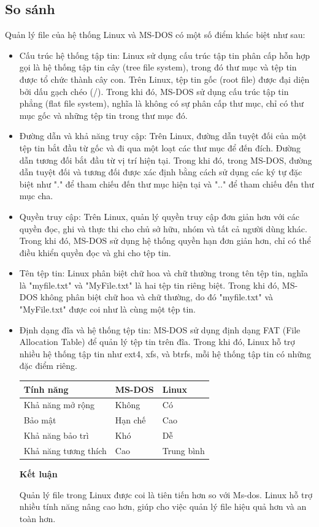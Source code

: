 \documentclass[12pt,a4paper]{article}
\begin{document}
\subsection{So sánh}
Quản lý file của hệ thống Linux và MS-DOS có một số điểm khác biệt như sau:
\begin{itemize}
	\item Cấu trúc hệ thống tập tin: Linux sử dụng cấu trúc tập tin phân cấp hỗn hợp gọi là hệ thống tập tin cây (tree file system), trong đó thư mục và tệp tin được tổ chức thành cây con. Trên Linux, tệp tin gốc (root file) được đại diện bởi dấu gạch chéo (/). Trong khi đó, MS-DOS sử dụng cấu trúc tập tin phẳng (flat file system), nghĩa là không có sự phân cấp thư mục, chỉ có thư mục gốc và những tệp tin trong thư mục đó.
	\item Đường dẫn và khả năng truy cập: Trên Linux, đường dẫn tuyệt đối của một tệp tin bắt đầu từ gốc và đi qua một loạt các thư mục để đến đích. Đường dẫn tương đối bắt đầu từ vị trí hiện tại. Trong khi đó, trong MS-DOS, đường dẫn tuyệt đối và tương đối được xác định bằng cách sử dụng các ký tự đặc biệt như "." để tham chiếu đến thư mục hiện tại và ".." để tham chiếu đến thư mục cha.
	\item Quyền truy cập: Trên Linux, quản lý quyền truy cập đơn giản hơn với các quyền đọc, ghi và thực thi cho chủ sở hữu, nhóm và tất cả người dùng khác. Trong khi đó, MS-DOS sử dụng hệ thống quyền hạn đơn giản hơn, chỉ có thể điều khiển quyền đọc và ghi cho tệp tin.
	\item Tên tệp tin: Linux phân biệt chữ hoa và chữ thường trong tên tệp tin, nghĩa là "myfile.txt" và "MyFile.txt" là hai tệp tin riêng biệt. Trong khi đó, MS-DOS không phân biệt chữ hoa và chữ thường, do đó "myfile.txt" và "MyFile.txt" được coi như là cùng một tệp tin.
	\item Định dạng đĩa và hệ thống tệp tin: MS-DOS sử dụng định dạng FAT (File Allocation Table) để quản lý tệp tin trên đĩa. Trong khi đó, Linux hỗ trợ nhiều hệ thống tập tin như ext4, xfs, và btrfs, mỗi hệ thống tập tin có những đặc điểm riêng.
	
\begin{tabular}{|p{5cm}|p{5.5cm}|p{5.5cm}|}
		\hline 
	Tính năng &  MS-DOS &  Linux \\
	\hline 
	Khả năng mở rộng & Không & Có \\
	\hline 
	Bảo mật & Hạn chế & Cao \\
	\hline 
	Khả năng bảo trì & Khó & Dễ \\
	\hline 
	Khả năng tương thích & Cao & Trung bình \\
	\hline 
\end{tabular}
\textbf{Kết luận}

Quản lý file trong Linux được coi là tiên tiến hơn so với Ms-dos. Linux hỗ trợ nhiều tính năng nâng cao hơn, giúp cho việc quản lý file hiệu quả hơn và an toàn hơn.
\end{itemize}
\end{document}
